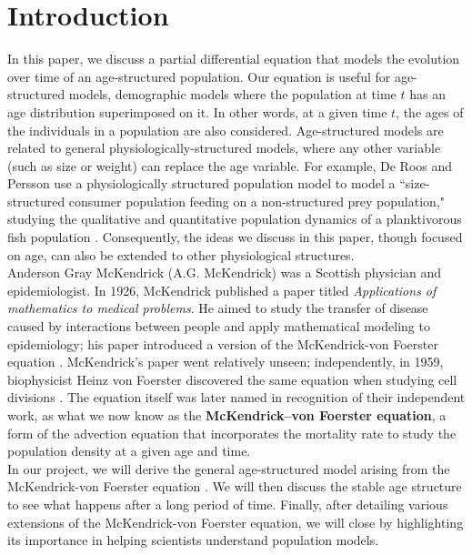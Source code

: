 \section{Introduction}

In this paper, we discuss a partial differential equation that models the evolution over time of an age-structured population. Our equation is useful for age-structured models, demographic models where the population at time $t$ has an age distribution superimposed on it. In other words, at a given time $t$, the ages of the individuals in a population are also considered. Age-structured models are related to general physiologically-structured models, where any other variable (such as size or weight) can replace the age variable. For example, De Roos and Persson use a physiologically structured population model to model a ``size-structured consumer population feeding on a non-structured prey population," studying the qualitative and quantitative population dynamics of a planktivorous fish population \cite{deRoos_Persson}. Consequently, the ideas we discuss in this paper, though focused on age, can also be extended to other physiological structures. \\


Anderson Gray McKendrick (A.G. McKendrick) was a Scottish physician and epidemiologist. In 1926, McKendrick published a paper titled \textit{Applications of mathematics to medical problems}. He aimed to study the transfer of disease caused by interactions between people and apply mathematical modeling to epidemiology; his paper introduced a version of the McKendrick-von Foerster equation \cite{mck1925}. McKendrick's paper went relatively unseen; independently, in 1959, biophysicist Heinz von Foerster discovered the same equation when studying cell divisions \cite{keyfitz_keyfitz}. The equation itself was later named in recognition of their independent work, as what we now know as the \textbf{McKendrick–von Foerster equation}, a form of the advection equation that incorporates the mortality rate to study the population density at a given age and time. \\

In our project, we will derive the general age-structured model arising from the McKendrick-von Foerster equation \cite{logan}. We will then discuss the stable age structure to see what happens after a long period of time. Finally, after detailing various extensions of the McKendrick-von Foerster equation, we will close by highlighting its importance in helping scientists understand population models. 
